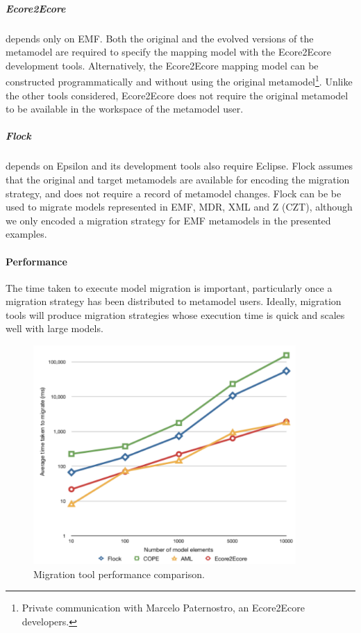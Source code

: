 \subparagraph{Ecore2Ecore} depends only on EMF. Both the original and the evolved versions of the metamodel are required to specify the mapping model with the Ecore2Ecore development tools. Alternatively, the Ecore2Ecore mapping model can be constructed programmatically and without using the original metamodel\footnote{Private communication with Marcelo Paternostro, an Ecore2Ecore developers.}. Unlike the other tools considered, Ecore2Ecore does not require the original metamodel to be available in the workspace of the metamodel user.

\subparagraph{Flock} depends on Epsilon and its development tools also require Eclipse. Flock assumes that the original and target metamodels are available for encoding the migration strategy, and does not require a record of metamodel changes. Flock can be be used to migrate models represented in EMF, MDR, XML and Z (CZT), although we only encoded a migration strategy for EMF metamodels in the presented examples.


\paragraph{Performance}
The time taken to execute model migration is important, particularly once a migration strategy has been distributed to metamodel users. Ideally, migration tools will produce migration strategies whose execution time is quick and scales well with large models.

\begin{figure}[htbp]
	\centering
	\includegraphics[width=10cm]{6.Evaluation/images/migration_tool_performance.pdf}
	\caption{Migration tool performance comparison.}
	\label{fig:performance}
\end{figure}

